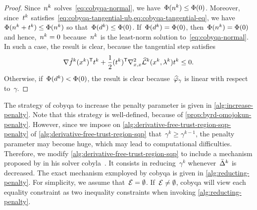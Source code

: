 \begin{proof}
    Since~$\nstep[k]$ solves~\cref{eq:cobyqa-normal}, we have~$\Phi(\nstep[k]) \le \Phi(0)$.
    Moreover, since~$\tstep[k]$ satisfies~\cref{eq:cobyqa-tangential-ub,eq:cobyqa-tangential-eq}, we have~$\Phi(\nstep[k] + \tstep[k]) \le \Phi(\nstep[k])$ so that~$\Phi(\step[k]) \le \Phi(0)$.
    If~$\Phi(\step[k]) = \Phi(0)$, then~$\Phi(\nstep[k]) = \Phi(0)$ and hence,~$\nstep[k] = 0$ because~$\nstep[k]$ is the least-norm solution to~\cref{eq:cobyqa-normal}.
    In such a case, the result is clear, because the tangential step satisfies
    \begin{equation*}
        \nabla \objm[k](\iter[k])^{\T} \tstep[k] + \frac{1}{2} (\tstep[k])^{\T} \nabla_{x, x}^2 \lagm[k](\iter[k], \lm[k]) \tstep[k]  \le 0.
    \end{equation*}
    Otherwise, if~$\Phi(\step[k]) < \Phi(0)$, the result is clear because~$\meritm_{\gamma}$ is linear with respect to~$\gamma$.
\end{proof}

The strategy of \gls{cobyqa} to increase the penalty parameter is given in \cref{alg:increase-penalty}.
Note that this strategy is well-defined, because of \cref{prop:byrd-omojokun-penalty}.
However, since we impose on \cref{alg:derivative-free-trust-region-sqp-penalty} of \cref{alg:derivative-free-trust-region-sqp} that~$\gamma^k \ge \gamma^{k - 1}$, the penalty parameter may become huge, which may lead to computational difficulties.
Therefore, we modify \cref{alg:derivative-free-trust-region-sqp} to include a mechanism proposed by \citeauthor{Powell_1994} in his solver \gls{cobyla}~\cite{Powell_1994}.
It consists in reducing~$\gamma^k$ whenever~$\radlb[k]$ is decreased.
The exact mechanism exmployed by \gls{cobyqa} is given in \cref{alg:reducting-penalty}.
For simplicity, we assume that~$\mathcal{E} = \emptyset$.
If~$\mathcal{E} \neq \emptyset$, \gls{cobyqa} will view each equality constraint as two inequality constraints when invoking \cref{alg:reducting-penalty}.

